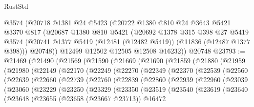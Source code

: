 \begin{lexlean}{RustStd}
\begin{coremodule}
    @3574
    (@20718
      @1381
      @24
      @5423
      (@20722
        @1380
        @810
        @24
        @3643
        @5421
        @3370
        @817
        (@20687
          @1380
          @810
          @5421
          (@20692
            @1378
            @315
            @398
            @27
            @5419
            @3574
            (@20741 @1377 @5419 (@12481 (@12482 @5419)) (@11836 (@12487 @1377 @398)))
            @20748))
        @12499
        @12502
        @12505
        @12508
        @16232))
    @20748
@23793 := @21469
    (@21490
      (@21569
        (@21590
          (@21669
            (@21690
              (@21859
                (@21880
                  (@21959
                    (@21980
                      (@22149
                        (@22170
                          (@22249
                            (@22270
                              (@22349
                                (@22370
                                  (@22539
                                    (@22560
                                      (@22639
                                        (@22660
                                          (@22739
                                            (@22760
                                              (@22839
                                                (@22860
                                                  (@22939
                                                    (@22960
                                                      (@23039
                                                        (@23060
                                                          (@23229
                                                            (@23250
                                                              (@23329
                                                                (@23350
                                                                  (@23519
                                                                    (@23540
                                                                      (@23619
                                                                        (@23640
                                                                          (@23648
                                                                            (@23655
                                                                              (@23658
                                                                                (@23667 @23713))
                                                                              @16472

\end{coremodule}
\end{lexlean}
